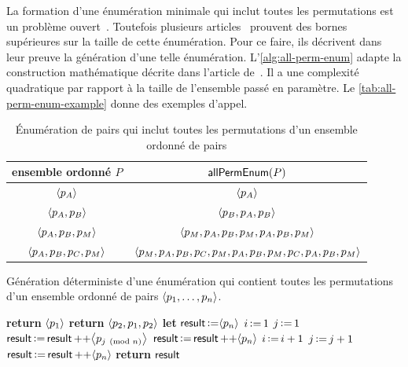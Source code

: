 La formation d'une énumération minimale qui inclut toutes les permutations est un problème ouvert~\autocite{engen2018_containing}.
Toutefois plusieurs articles~\autocite{adleman_1974_shortperm,koutas1975shortest,galbiati1976permutation,zualinescu2011shorter,radomirovic2012construction} prouvent des bornes supérieures sur la taille de cette énumération.
Pour ce faire, ils décrivent dans leur preuve la génération d'une telle énumération.
L'\autoref{alg:all-perm-enum} adapte la construction mathématique décrite dans l'article de~\textcite{adleman_1974_shortperm}.
Il a une complexité quadratique par rapport à la taille de l'ensemble passé en paramètre.
Le \autoref{tab:all-perm-enum-example} donne des exemples d'appel.

\clearpage

\begin{table}[ht]
    \centering
    \begin{tabular}{cc}
        ensemble ordonné $P$ & $\trm{allPermEnum}(P)$ \\
        \toprule
        $\tuple*{p_A}$ & $\tuple*{p_A}$ \\
        $\tuple*{p_A, p_B}$ & $\tuple*{p_B, p_A, p_B}$ \\
        $\tuple*{p_A, p_B, p_M}$ & $\tuple*{p_M, p_A, p_B, p_M, p_A, p_B, p_M}$ \\
        $\tuple*{p_A, p_B, p_C, p_M}$ & $\tuple*{p_M, p_A, p_B, p_C, p_M, p_A, p_B, p_M, p_C, p_A, p_B, p_M}$ \\
    \end{tabular}
    \caption{Énumération de pairs qui inclut toutes les permutations d'un ensemble ordonné de pairs}\label{tab:all-perm-enum-example}
\end{table}

\begin{algorithm}[ht]
\caption[Génération déterministe d'une énumération qui contient toutes les permutations d'un ensemble ordonné de pairs]{Génération déterministe d'une énumération qui contient toutes les permutations d'un ensemble ordonné de pairs $\tuple*{p_1, \dotsc, p_n}$.}\label{alg:all-perm-enum}
\begin{algorithmic}[1]
        \State \textbf{return} $\tuple*{p_1}$
        \State \textbf{return} $\tuple*{p_2, p_1, p_2}$
    \Else{}
        \State \textbf{let} $\trm{result} \assign \tuple*{p_n}$
        \State $i \assign 1$
        \State $j \assign 1$
            \State $\trm{result} \assign \trm{result} \lappend \tuple*{p_{j \pmod{n}}}$
                \State $\trm{result} \assign \trm{result} \lappend \tuple*{p_n}$
                \State $i \assign i + 1$
            \EndIf
            \State $j \assign j + 1$
        \EndWhile
        \State $\trm{result} \assign \trm{result} \lappend \tuple*{p_n}$
        \State \textbf{return} $\trm{result}$
    \EndIf
\EndFunction
\end{algorithmic}
\end{algorithm}


